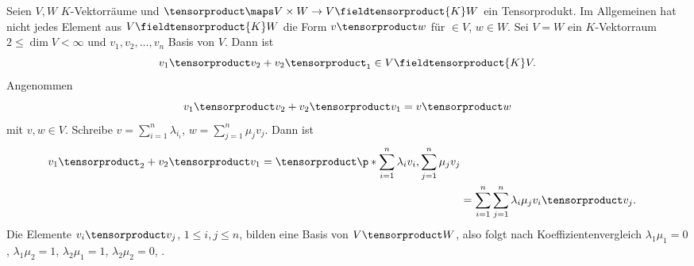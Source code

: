 \begin{bemerkung*}
  Seien \( V,W \) \( K \)-Vektorräume und \( \tensorproduct \maps V\times W\to V\fieldtensorproduct{K} W \) ein Tensorprodukt. Im Allgemeinen hat nicht jedes Element aus \( V\fieldtensorproduct{K}W \) die Form \( v\tensorproduct w \) für \( \in V \), \( w\in W \). Sei \zb \( V=W \) ein \( K \)-Vektorraum \( 2\leq \dim{V}<\infty \) und \( v_1,v_2,\dotsc,v_n \) Basis von \( V \). Dann ist
  \begin{equation*}
    v_1\tensorproduct v_2+v_2\tensorproduct _1\in V\fieldtensorproduct{K}V.
  \end{equation*}
  Angenommen
  \begin{equation*}
    v_1\tensorproduct v_2+v_2\tensorproduct v_1=v\tensorproduct w
  \end{equation*}
  mit \( v,w\in V \). Schreibe \( v=\sum_{i=1}^{n}\lambda_i _i \), \( w=\sum_{j=1}^{n}\mu_j v_j \). Dann ist
  \begin{align*}
    v_1\tensorproduct _2+v_2\tensorproduct v_1=\tensorproduct \p*{\sum_{i=1}^{n}\lambda_i v_i, \sum_{j=1}^{n}\mu_j v_j}\\
    &=\sum_{i=1}^{n}\sum_{j=1}^{n}\lambda_i \mu_j v_i\tensorproduct v_j.
  \end{align*}
Die Elemente \( v_i\tensorproduct v_j \), \( 1\leq i,j\leq n \), bilden eine Basis von \( V\tensorproduct W \), also folgt nach Koeffizientenvergleich \( \lambda_1 \mu_1=0 \), \( \lambda_1\mu_2=1 \), \( \lambda_2\mu_1=1 \), \( \lambda_2 \mu_2=0 \), \contra.
\end{bemerkung*}
